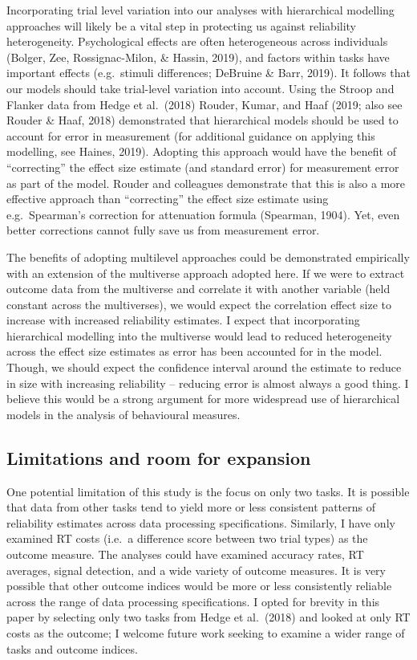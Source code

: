 \documentclass[
  english,
  man,floatsintext]{apa6}
\begin{document}
Incorporating trial level variation into our analyses with hierarchical modelling approaches will likely be a vital step in protecting us against reliability heterogeneity. Psychological effects are often heterogeneous across individuals (Bolger, Zee, Rossignac-Milon, \& Hassin, 2019), and factors within tasks have important effects (e.g.~stimuli differences; DeBruine \& Barr, 2019). It follows that our models should take trial-level variation into account. Using the Stroop and Flanker data from Hedge et al.~(2018) Rouder, Kumar, and Haaf (2019; also see Rouder \& Haaf, 2018) demonstrated that hierarchical models should be used to account for error in measurement (for additional guidance on applying this modelling, see Haines, 2019). Adopting this approach would have the benefit of \enquote{correcting} the effect size estimate (and standard error) for measurement error as part of the model. Rouder and colleagues demonstrate that this is also a more effective approach than \enquote{correcting} the effect size estimate using e.g.~Spearman's correction for attenuation formula (Spearman, 1904). Yet, even better corrections cannot fully save us from measurement error.

The benefits of adopting multilevel approaches could be demonstrated empirically with an extension of the multiverse approach adopted here. If we were to extract outcome data from the multiverse and correlate it with another variable (held constant across the multiverses), we would expect the correlation effect size to increase with increased reliability estimates. I expect that incorporating hierarchical modelling into the multiverse would lead to reduced heterogeneity across the effect size estimates as error has been accounted for in the model. Though, we should expect the confidence interval around the estimate to reduce in size with increasing reliability -- reducing error is almost always a good thing. I believe this would be a strong argument for more widespread use of hierarchical models in the analysis of behavioural measures.

\hypertarget{limitations-and-room-for-expansion}{%
\subsection{Limitations and room for expansion}\label{limitations-and-room-for-expansion}}

One potential limitation of this study is the focus on only two tasks. It is possible that data from other tasks tend to yield more or less consistent patterns of reliability estimates across data processing specifications. Similarly, I have only examined RT costs (i.e.~a difference score between two trial types) as the outcome measure. The analyses could have examined accuracy rates, RT averages, signal detection, and a wide variety of outcome measures. It is very possible that other outcome indices would be more or less consistently reliable across the range of data processing specifications. I opted for brevity in this paper by selecting only two tasks from Hedge et al.~(2018) and looked at only RT costs as the outcome; I welcome future work seeking to examine a wider range of tasks and outcome indices.
\end{document}

